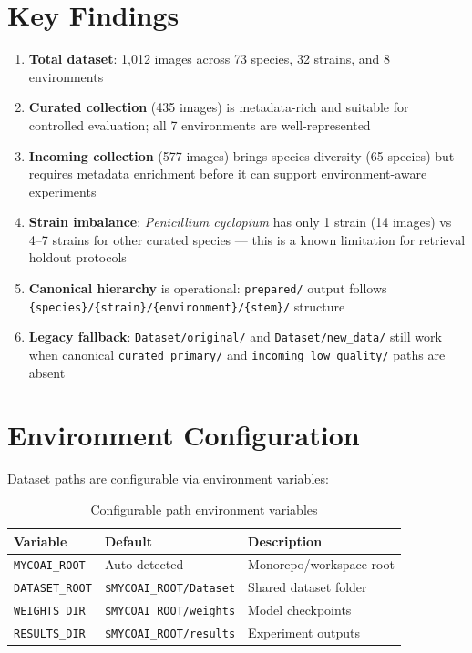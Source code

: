\documentclass[11pt]{article}
\begin{document}
\section{Key Findings}

\begin{enumerate}[itemsep=3pt]
  \item \textbf{Total dataset}: 1,012 images across 73 species, 32 strains, and 8 environments
  \item \textbf{Curated collection} (435 images) is metadata-rich and suitable for
    controlled evaluation; all 7 environments are well-represented
  \item \textbf{Incoming collection} (577 images) brings species diversity (65
    species) but requires metadata enrichment before it can support
    environment-aware experiments
  \item \textbf{Strain imbalance}: \textit{Penicillium cyclopium} has only 1 strain
    (14 images) vs 4--7 strains for other curated species --- this is a known
    limitation for retrieval holdout protocols
  \item \textbf{Canonical hierarchy} is operational: \texttt{prepared/} output
    follows \texttt{\{species\}/\{strain\}/\{environment\}/\{stem\}/} structure
  \item \textbf{Legacy fallback}: \texttt{Dataset/original/} and
    \texttt{Dataset/new\_data/} still work when canonical
    \texttt{curated\_primary/} and \texttt{incoming\_low\_quality/} paths are absent
\end{enumerate}

\section{Environment Configuration}

Dataset paths are configurable via environment variables:

\begin{table}[H]
\centering
\begin{tabular}{lll}
\toprule
\textbf{Variable} & \textbf{Default} & \textbf{Description} \\
\midrule
\texttt{MYCOAI\_ROOT}   & Auto-detected       & Monorepo/workspace root \\
\texttt{DATASET\_ROOT}  & \texttt{\$MYCOAI\_ROOT/Dataset} & Shared dataset folder \\
\texttt{WEIGHTS\_DIR}   & \texttt{\$MYCOAI\_ROOT/weights}  & Model checkpoints \\
\texttt{RESULTS\_DIR}   & \texttt{\$MYCOAI\_ROOT/results}  & Experiment outputs \\
\bottomrule
\end{tabular}
\caption{Configurable path environment variables}
\label{tab:env_vars}
\end{table}
\end{document}
